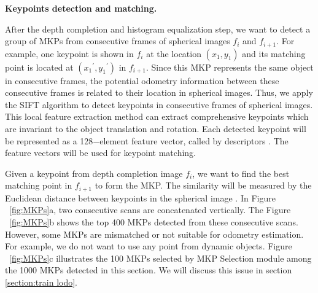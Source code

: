 \documentclass[sigconf]{acmart}
\newcommand{\bfsection}[1]{\vspace*{0.1cm}\noindent\textbf{#1.}}
\begin{document}
\bfsection{Keypoints detection and matching}

After the depth completion and histogram equalization step, we want to detect a group of MKPs from consecutive frames of spherical images $f_i$ and $f_{i+1}$. For example, one keypoint is shown in $f_i$ at the location $(x_1, y_1)$  and its matching point is located at $({x_1}^\prime, {y_1}^\prime)$ in $f_{i+1}$. Since this MKP represents the same object in consecutive frames, the potential odometry information between these consecutive frames is related to their location in spherical images. Thus, we apply the SIFT algorithm to detect keypoints in consecutive frames of spherical images. This local feature extraction method can extract comprehensive keypoints which are invariant to the object translation and rotation. Each detected keypoint will be represented as a 128$-$element feature vector, called by descriptors \cite{whensift}. The feature vectors will be used for keypoint matching.

Given a keypoint from depth completion image  $f_i$, we want to find the best matching point in $f_{i+1}$ to form the MKP. The similarity will be measured by the Euclidean distance between keypoints in the spherical image \cite{siftvo}. In Figure ~\ref{fig:MKPs}a, two consecutive scans are concatenated vertically. The Figure ~\ref{fig:MKPs}b shows the top 400 MKPs detected from these consecutive scans. However, some MKPs are mismatched or not suitable for odometry estimation. For example, we do not want to use any point from dynamic objects. Figure ~\ref{fig:MKPs}c illustrates the 100 MKPs selected by MKP Selection module among the 1000 MKPs detected in this section. We will discuss this issue in section \ref{section:train lodo}.
\end{document}
